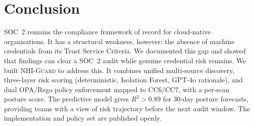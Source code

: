 \documentclass[journal]{IEEEtran}
\begin{document}
\section{Conclusion}
\label{sec:conclusion}

SOC~2 remains the compliance framework of record for cloud-native organisations. It has a structural weakness, however: the absence of machine credentials from its Trust Service Criteria. We documented this gap and showed that findings can clear a SOC~2 audit while genuine credential risk remains. We built \textsc{NHI-Guard} to address this. It combines unified multi-source discovery, three-layer risk scoring (deterministic, Isolation Forest, GPT-4o rationale), and dual OPA/Rego policy enforcement mapped to CC6/CC7, with a per-scan posture score. The predictive model gives $R^{2} > 0.89$ for 30-day posture forecasts, providing teams with a view of risk trajectory before the next audit window. The implementation and policy set are published openly.
\end{document}
